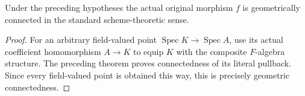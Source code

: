 \begin{theorem}
\label{thm:fc-projective-birational-geometrically-connected}
\leanok
{}
Under the preceding hypotheses the actual original morphism $f$ is
geometrically connected in the standard scheme-theoretic sense.
\end{theorem}
\begin{proof}
For an arbitrary field-valued point $\operatorname{Spec}K\to\operatorname{Spec}A$,
use its actual coefficient homomorphism $A\to K$ to equip $K$ with the
composite $F$-algebra structure. The preceding theorem proves
connectedness of its literal pullback. Since every field-valued point
is obtained this way, this is precisely geometric connectedness.
\end{proof}
